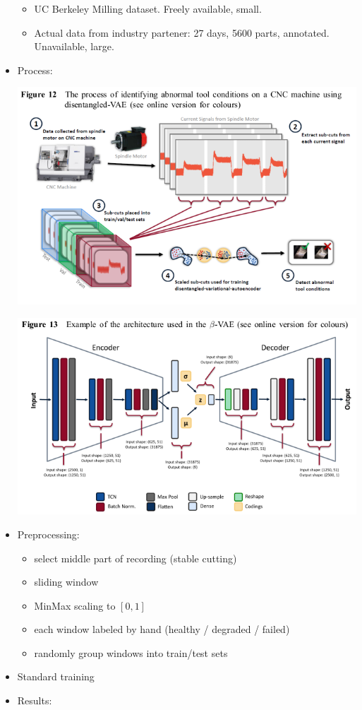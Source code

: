 \documentclass[
  letterpaper,
  DIV=11,
  numbers=noendperiod]{scrartcl}
\providecommand{\tightlist}{%
  \setlength{\itemsep}{0pt}\setlength{\parskip}{0pt}}\usepackage{longtable,booktabs,array}
\begin{document}
\begin{itemize}
  \begin{itemize}
  \tightlist
  \item
    UC Berkeley Milling dataset. Freely available, small.
  \item
    Actual data from industry partener: 27 days, 5600 parts, annotated.
    Unavailable, large.
  \end{itemize}
\item
  Process:

  \includegraphics{img/2023-01-12-11-29-43.png}

  \includegraphics{img/2023-01-12-11-35-37.png}
\item
  Preprocessing:

  \begin{itemize}
  \tightlist
  \item
    select middle part of recording (stable cutting)
  \item
    sliding window
  \item
    MinMax scaling to \([0,1]\)
  \item
    each window labeled by hand (healthy / degraded / failed)
  \item
    randomly group windows into train/test sets
  \end{itemize}
\item
  Standard training
\item
  Results:


\end{itemize}
\end{document}
